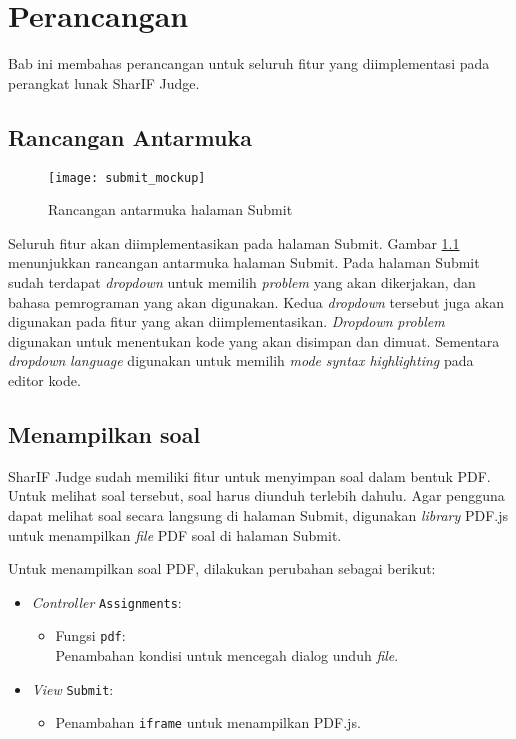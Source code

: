 \chapter{Perancangan}
\label{chap:perancangan}

Bab ini membahas perancangan untuk seluruh fitur yang diimplementasi pada  perangkat lunak SharIF Judge.

\section{Rancangan Antarmuka}
\label{sec:4:antarmuka}

\begin{figure}[H]
	\centering  
	\texttt{[image: submit\_mockup]}  
	\caption{Rancangan antarmuka halaman Submit} 
	\label{fig:4:antarmuka} 
\end{figure} 

Seluruh fitur akan diimplementasikan pada halaman Submit. Gambar \ref{fig:4:antarmuka} menunjukkan rancangan antarmuka halaman Submit. Pada halaman Submit sudah terdapat \textit{dropdown} untuk memilih \textit{problem} yang akan dikerjakan, dan bahasa pemrograman yang akan digunakan. Kedua \textit{dropdown} tersebut juga akan digunakan pada fitur yang akan diimplementasikan. \textit{Dropdown} \textit{problem} digunakan untuk menentukan kode yang akan disimpan dan dimuat. Sementara \textit{dropdown} \textit{language} digunakan untuk memilih \textit{mode} \textit{syntax highlighting} pada editor kode.

\section{Menampilkan soal}
\label{sec:4:soal}

SharIF Judge sudah memiliki fitur untuk menyimpan soal dalam bentuk PDF. Untuk melihat soal tersebut, soal harus diunduh terlebih dahulu. Agar pengguna dapat melihat soal secara langsung di halaman Submit, digunakan \textit{library} PDF.js untuk menampilkan \textit{file} PDF soal di halaman Submit.

Untuk menampilkan soal PDF, dilakukan perubahan sebagai berikut:
\begin{itemize}
	\item \textit{Controller} \verb|Assignments|:
    \begin{itemize}
		\item Fungsi \verb|pdf|: \\ Penambahan kondisi untuk mencegah dialog unduh \textit{file}.
    \end{itemize}
    \item \textit{View} \verb|Submit|:
    \begin{itemize}
        \item Penambahan \verb|iframe| untuk menampilkan PDF.js.
    \end{itemize}
\end{itemize}


